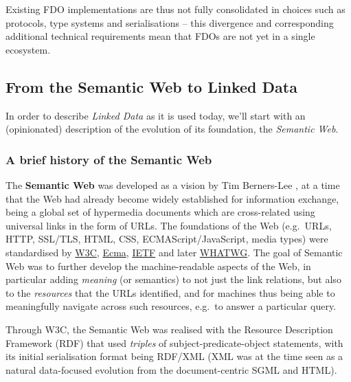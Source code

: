 \documentclass[fleqn,10pt,lineno]{wlpeerjlua}
\begin{document}
Existing FDO implementations \autocite{wittenburgFAIRDigitalObject2022b} are thus not fully consolidated in choices such as protocols, type systems and serialisations -- this divergence and corresponding additional technical requirements mean that FDOs are not yet in a single ecosystem. 

\subsection*{From the Semantic Web to Linked Data}\label{sec:ld}

In order to describe \emph{Linked Data} as it is used today, we'll start with an (opinionated) description of the evolution of its foundation, the \emph{Semantic Web}.

\subsubsection*{A brief history of the Semantic Web}\label{sec:semweb}

The \textbf{Semantic Web} was developed as a vision by Tim Berners-Lee \autocite{berners-leeWeavingWebOriginal1999}, at a time that the Web had already become widely established for information exchange, being a global set of hypermedia documents which are cross-related using universal links in the form of URLs. The foundations of the Web (e.g.~URLs, HTTP, SSL/TLS, HTML, CSS, ECMAScript/JavaScript, media types) were standardised by \href{https://www.w3.org/standards/}{W3C}, \href{https://www.ecma-international.org/}{Ecma}, \href{https://www.ietf.org/standards/}{IETF} and later \href{https://whatwg.org/}{WHATWG}. The goal of Semantic Web was to further develop the machine-readable aspects of the Web, in particular adding \emph{meaning} (or semantics) to not just the link relations, but also to the \emph{resources} that the URLs identified, and for machines thus being able to meaningfully navigate across such resources, e.g.~to answer a particular query.

Through W3C, the Semantic Web was realised with the Resource Description Framework (RDF) \autocite{w3-rdf11-primer} that used \emph{triples} of subject-predicate-object statements, with its initial serialisation format \autocite{w3-rdf-syntax99} being RDF/XML (XML was at the time seen as a natural data-focused evolution from the document-centric SGML and HTML).
\end{document}
